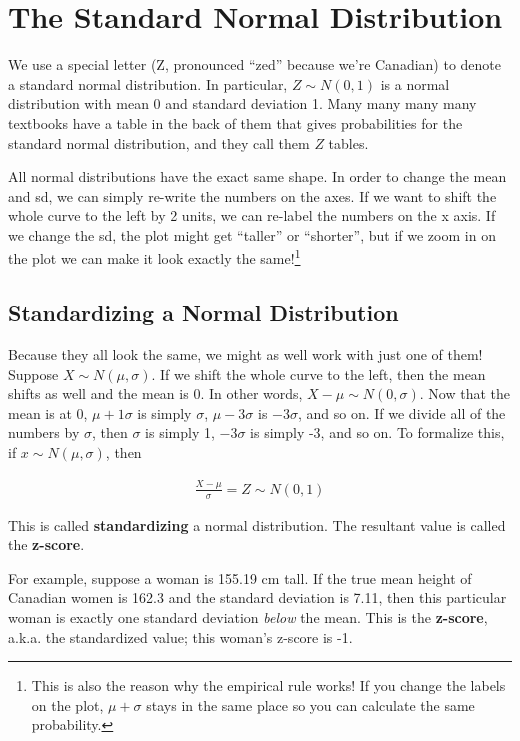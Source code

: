 \documentclass[
  letterpaper,
  DIV=11,
  numbers=noendperiod]{scrreprt}
\begin{document}
\hypertarget{the-standard-normal-distribution}{%
\chapter{The Standard Normal
Distribution}\label{the-standard-normal-distribution}}

We use a special letter (Z, pronounced ``zed'' because we're Canadian)
to denote a standard normal distribution. In particular,
\(Z\sim N(0, 1)\) is a normal distribution with mean 0 and standard
deviation 1. Many many many many textbooks have a table in the back of
them that gives probabilities for the standard normal distribution, and
they call them \(Z\) tables.

All normal distributions have the exact same shape. In order to change
the mean and sd, we can simply re-write the numbers on the axes. If we
want to shift the whole curve to the left by 2 units, we can re-label
the numbers on the x axis. If we change the sd, the plot might get
``taller'' or ``shorter'', but if we zoom in on the plot we can make it
look exactly the same!\footnote{This is also the reason why the
  empirical rule works! If you change the labels on the plot,
  \(\mu+\sigma\) stays in the same place so you can calculate the same
  probability.}

\hypertarget{standardizing-a-normal-distribution}{%
\section{Standardizing a Normal
Distribution}\label{standardizing-a-normal-distribution}}

Because they all look the same, we might as well work with just one of
them! Suppose \(X\sim N(\mu,\sigma)\). If we shift the whole curve to
the left, then the mean shifts as well and the mean is 0. In other
words, \(X-\mu \sim N(0,\sigma)\). Now that the mean is at 0,
\(\mu + 1\sigma\) is simply \(\sigma\), \(\mu-3\sigma\) is \(-3\sigma\),
and so on. If we divide all of the numbers by \(\sigma\), then
\(\sigma\) is simply 1, \(-3\sigma\) is simply -3, and so on. To
formalize this, if \(x\sim N(\mu,\sigma)\), then

\begin{align*}
\frac{X-\mu}{\sigma} = Z \sim N(0, 1)
\end{align*}

This is called \textbf{standardizing} a normal distribution. The
resultant value is called the \textbf{z-score}.

For example, suppose a woman is 155.19 cm tall. If the true mean height
of Canadian women is 162.3 and the standard deviation is 7.11, then this
particular woman is exactly one standard deviation \emph{below} the
mean. This is the \textbf{z-score}, a.k.a. the standardized value; this
woman's z-score is -1.
\end{document}
